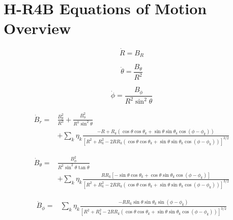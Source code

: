 \chapter{H-R4B Equations of Motion Overview} \label{apx:hr4b-overview}

\begin{equation} \tag{2.67}
    \boxed{
            \dot{R} = B_R
    }
\end{equation}


\begin{equation} \tag{2.72}
    \boxed{
            \dot{\theta} = \frac{B_\theta}{R^2}
    }
\end{equation}


\begin{equation} \tag{2.76}
    \boxed{
            \dot{\phi} = \frac{B_\phi}{R^2 \sin^2{\theta}}
    }
\end{equation}


\begin{equation} \tag{2.86}
    \boxed{
        \!\begin{aligned}
            \dot{B}_r = &\frac{B_\theta^2}{R^3} + \frac{B_\phi^2}{R^3 \sin^2{\theta}} \\
            & + \sum\limits_{k} \eta_k \frac{-R + R_k \left(\cos{\theta}\cos{\theta_k} + \sin{\theta}\sin{\theta_k}\cos{(\phi - \phi_k)}\right)}{\left[R^2 + R_k^2 - 2 R R_k \left(\cos{\theta}\cos{\theta_k} + \sin{\theta}\sin{\theta_k}\cos{(\phi - \phi_k)} \right) \right]^{3/2}}
        \end{aligned}
    }
\end{equation}


\begin{equation} \tag{2.87}
    \boxed{
        \!\begin{aligned}
            \dot{B}_\theta = &\frac{B_\phi^2}{R^2 \sin^2{\theta} \tan{\theta}} \\
            &+ \sum\limits_{k} \eta_k \frac{R R_k \left[-\sin{\theta}\cos{\theta_k} + \cos{\theta}\sin{\theta_k}\cos{(\phi - \phi_k)} \right]}{\left[R^2 + R_k^2 - 2 R R_k \left(\cos{\theta}\cos{\theta_k} + \sin{\theta}\sin{\theta_k}\cos{(\phi - \phi_k)} \right) \right]^{3/2}}
        \end{aligned}
    }
\end{equation}


\begin{equation} \tag{2.88}
    \boxed{
        \!\begin{aligned}
            \dot{B}_\phi = &\sum\limits_{k} \eta_k \frac{- R R_k \sin{\theta}\sin{\theta_k}\sin{(\phi - \phi_k)}}{\left[R^2 + R_k^2 - 2 R R_k \left(\cos{\theta}\cos{\theta_k} + \sin{\theta}\sin{\theta_k}\cos{(\phi - \phi_k)} \right) \right]^{3/2}}
        \end{aligned}
    }
\end{equation}

